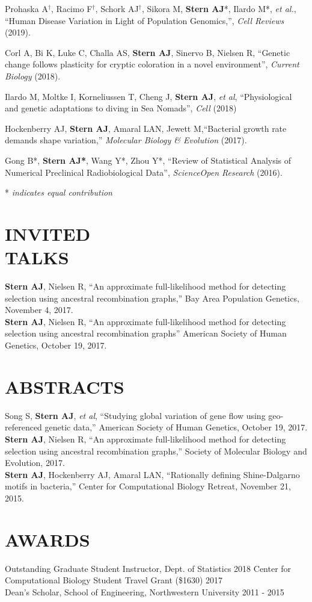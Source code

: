 \documentclass[margin, 10pt]{res} %
\begin{document}
\begin{resume}
Prohaska A$^\dag$, Racimo F$^\dag$, Schork AJ$^\dag$, Sikora M, {\bf Stern AJ}*, Ilardo M*, {\it et al.}, ``Human Disease Variation in Light of Population Genomics,'',  {\it Cell Reviews} (2019).

Corl A, Bi K, Luke C, Challa AS, {\bf Stern AJ}, Sinervo B, Nielsen R, ``Genetic change follows plasticity for cryptic coloration in a novel environment'', {\it Current Biology} (2018).

Ilardo M, Moltke I, Korneliussen T, Cheng J, {\bf Stern AJ}, {\it et al}, ``Physiological and genetic adaptations to diving in Sea Nomads'', {\it Cell} (2018)

Hockenberry AJ, {\bf Stern AJ}, Amaral LAN, Jewett M,``Bacterial growth rate demands shape variation,'' {\it Molecular Biology \& Evolution} (2017).

Gong B*, {\bf Stern AJ*}, Wang Y*, Zhou Y*, ``Review of Statistical Analysis of Numerical Preclinical Radiobiological Data'', {\it ScienceOpen Research} (2016). 


* {\it indicates equal contribution}


\section{INVITED\\TALKS}
{\bf Stern AJ}, Nielsen R, ``An approximate full-likelihood method for detecting selection using ancestral recombination graphs,'' Bay Area Population Genetics, November 4, 2017.\\
{\bf Stern AJ}, Nielsen R, ``An approximate full-likelihood method for detecting selection using ancestral recombination graphs'' American Society of Human Genetics, October 19, 2017.

\section{ABSTRACTS}
Song S, {\bf Stern AJ}, {\it et al}, ``Studying global variation of gene flow using geo-referenced genetic data,'' American Society of Human Genetics, October 19, 2017.\\
{\bf Stern AJ}, Nielsen R, ``An approximate full-likelihood method for detecting selection using ancestral recombination graphs,'' Society of Molecular Biology and Evolution, 2017.\\
{\bf Stern AJ}, Hockenberry AJ,  Amaral LAN, “Rationally defining Shine-Dalgarno motifs in bacteria,” Center for Computational Biology Retreat, November 21, 2015.

\section{AWARDS} 

Outstanding Graduate Student Instructor, Dept. of Statistics \hfill 2018
Center for Computational Biology Student Travel Grant (\$1630) \hfill 2017\\
Dean’s Scholar, School of Engineering, Northwestern University \hfill 2011 - 2015\\


\end{resume}
\end{document}
